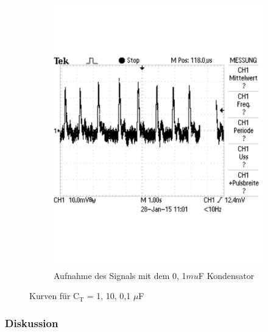 \documentclass[12pt,a4paper]{article}
\begin{document}
\begin{figure}[H]
\begin{subfigure}[t]{0.28\textwidth}
                \includegraphics[width=\textwidth , scale = 0.4]{a3_durch10.pdf}
                \caption[Aufnahme des Signals mit dem 0,1$mu$F Kondensator ]{Aufnahme des Signals mit dem 0,	1$mu$F Kondensator}
  				\label{fig:3_durch}
        \end{subfigure}
        \caption{Kurven für C$_\text{T}$ = 1, 10, 0,1 $\mu$F}
        \label{fig:a3}
\end{figure}


\subsubsection*{Diskussion}
\end{document}
